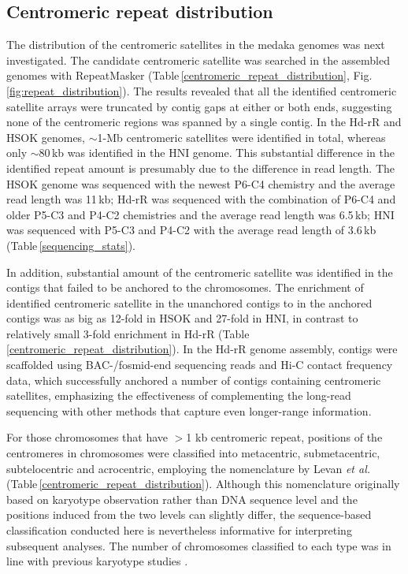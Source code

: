 \subsection*{Centromeric repeat distribution}
  The distribution of the centromeric satellites in the medaka genomes was next investigated. The candidate centromeric satellite was searched in the assembled genomes with RepeatMasker (Table\,\ref{centromeric_repeat_distribution}, Fig.\,\ref{fig:repeat_distribution}). The results revealed that all the identified centromeric satellite arrays were truncated by contig gaps at either or both ends, suggesting none of the centromeric regions was spanned by a single contig. In the Hd-rR and HSOK genomes, $\sim$1-Mb centromeric satellites were identified in total, whereas only $\sim$80\,kb was identified in the HNI genome. This substantial difference in the identified repeat amount is presumably due to the difference in read length. The HSOK genome was sequenced with the newest P6-C4 chemistry and the average read length was 11\,kb; Hd-rR was sequenced with the combination of P6-C4 and older P5-C3 and P4-C2 chemistries and the average read length was 6.5\,kb; HNI was sequenced with P5-C3 and P4-C2 with the average read length of 3.6\,kb (Table\,\ref{sequencing_stats}).

  In addition, substantial amount of the centromeric satellite was identified in the contigs that failed to be anchored to the chromosomes. The enrichment of identified centromeric satellite in the unanchored contigs to in the anchored contigs was as big as 12-fold in HSOK and 27-fold in HNI, in contrast to relatively small 3-fold enrichment in Hd-rR (Table\,\ref{centromeric_repeat_distribution}). In the Hd-rR genome assembly, contigs were scaffolded using BAC-/fosmid-end sequencing reads and Hi-C contact frequency data, which successfully anchored a number of contigs containing centromeric satellites, emphasizing the effectiveness of complementing the long-read sequencing with other methods that capture even longer-range information.


  For those chromosomes that have $>$1 kb centromeric repeat, positions of the centromeres in chromosomes were classified into metacentric, submetacentric, subtelocentric and acrocentric, employing the nomenclature by Levan \textit{et al.} \cite{levan1964} (Table\,\ref{centromeric_repeat_distribution}). Although this nomenclature originally based on karyotype observation rather than DNA sequence level and the positions induced from the two levels can slightly differ, the sequence-based classification conducted here is  nevertheless informative for interpreting subsequent analyses. The number of chromosomes classified to each type was in line with previous karyotype studies \cite{Uwa1981, Uwa1990}.

